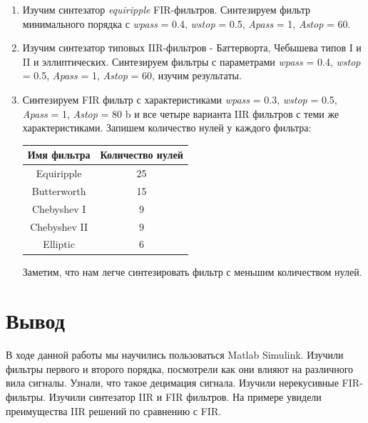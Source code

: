 \documentclass[a4paper, 12pt]{article}%
\begin{document}
\begin{enumerate}
\item Изучим синтезатор \textit{equiripple} FIR-фильтров. Синтезируем фильтр минимального порядка с \textit{wpass} = 0.4, \textit{wstop} = 0.5, \textit{Apass} = 1, \textit{Astop} = 60.

\item Изучим синтезатор типовых IIR-фильтров - Баттерворта, Чебышева типов I и II и эллиптических. Синтезируем фильтры с параметрами \textit{wpass} = 0.4, \textit{wstop} = 0.5, \textit{Apass} = 1, \textit{Astop} = 60, изучим результаты.

\item Синтезируем FIR фильтр с характеристиками \textit{wpass} = 0.3, \textit{wstop} = 0.5, \textit{Apass} = 1, \textit{Astop} = 80 b и все четыре варианта IIR фильтров с теми же характеристиками. Запишем количество нулей у каждого фильтра:

\begin{center}
\begin{tabular}{|c|c|}
\hline 
Имя фильтра & Количество нулей \\ 
\hline 
Equiripple & 25 \\ 
\hline 
Butterworth & 15 \\ 
\hline 
Chebyshev I & 9 \\ 
\hline 
Chebyshev II & 9 \\ 
\hline 
Elliptic & 6 \\ 
\hline 
\end{tabular} 
\end{center}

Заметим, что нам легче синтезировать фильтр с меньшим количеством нулей.
\end{enumerate}

\section{Вывод}

В ходе данной работы мы научились пользоваться Matlab Simulink. Изучили фильтры первого и второго порядка, посмотрели как они влияют на различного вила сигналы. Узнали, что такое децимация сигнала. Изучили нерекусивные FIR-фильтры. Изучили синтезатор IIR и FIR фильтров. На примере увидели преимущества IIR решений по сравнению с FIR.


\end{document}
